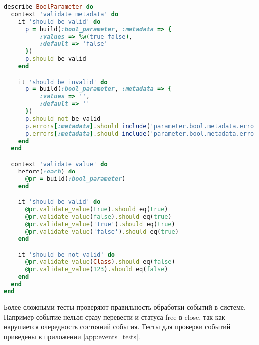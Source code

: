 \begin{lstlisting}[language=Ruby,caption=Тестирование возможных значений для
булевого параметра ,label={lst:test_bool_parameter}] 
describe BoolParameter do
  context 'validate metadata' do
    it 'should be valid' do
      p = build(:bool_parameter, :metadata => {
          :values => %w(true false),
          :default => 'false'
      })
      p.should be_valid
    end

    it 'should be invalid' do
      p = build(:bool_parameter, :metadata => {
          :values => '',
          :default => ''
      })
      p.should_not be_valid
      p.errors[:metadata].should include('parameter.bool.metadata.errors.default')
      p.errors[:metadata].should include('parameter.bool.metadata.errors.values')
    end
  end

  context 'validate value' do
    before(:each) do
      @pr = build(:bool_parameter)
    end

    it 'should be valid' do
      @pr.validate_value(true).should eq(true)
      @pr.validate_value(false).should eq(true)
      @pr.validate_value('true').should eq(true)
      @pr.validate_value('false').should eq(true)
    end

    it 'should be not valid' do
      @pr.validate_value(Class).should eq(false)
      @pr.validate_value(123).should eq(false)
    end
  end
end
\end{lstlisting}

Более сложными тесты проверяют правильность обработки событий в системе.
Например событие нельзя сразу перевести и статуса free в close, так как
нарушается очередность состояний события. Тесты для проверки событий приведены в
приложении \ref{app:events_tests}.
